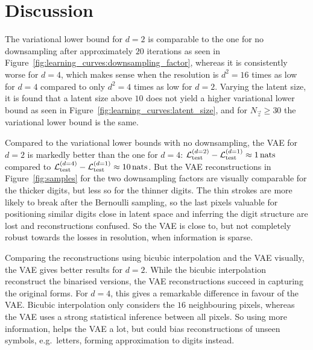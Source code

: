 \section{Discussion}
\label{sec:discussion}

The variational lower bound for $d = 2$ is comparable to the one for no downsampling after approximately $20$ iterations as seen in Figure~\ref{fig:learning_curves:downsampling_factor}, whereas it is consistently worse for $d = 4$, which makes sense when the resolution is $d^2 = 16$ times as low for $d = 4$ compared to only $d^2 = 4$ times as low for $d = 2$.
Varying the latent size, it is found that a latent size above $10$ does not yield a higher variational lower bound as seen in Figure~\ref{fig:learning_curves:latent_size}, and for $N_{\vec{z}} \geq 30$ the variational lower bound is the same.

Compared to the variational lower bounds with no downsampling, the VAE for $d = 2$ is markedly better than the one for $d = 4$: $\mathcal{L}_{\text{test}}^{(d = 2)} - \mathcal{L}_{\text{test}}^{(d = 1)} \approx \SI{1}{nats}$ compared to $\mathcal{L}_{\text{test}}^{(d = 4)} - \mathcal{L}_{\text{test}}^{(d = 1)} \approx \SI{10}{nats}$.
But the VAE reconstructions in Figure~\ref{fig:samples} for the two downsampling factors are visually comparable for the thicker digits, but less so for the thinner digits. The thin strokes are more likely to break after the Bernoulli sampling, so the last pixels valuable for positioning similar digits close in latent space and inferring the digit structure are lost and reconstructions confused.  
So the VAE is close to, but not completely robust towards the losses in resolution, when information is sparse. 

Comparing the reconstructions using bicubic interpolation and the VAE visually, the VAE gives better results for $d = 2$.
While the bicubic interpolation reconstruct the binarised versions, the VAE reconstructions succeed in capturing the original forms.
For $d = 4$, this gives a remarkable difference in favour of the VAE.
Bicubic interpolation only considers the $16$ neighbouring pixels, whereas the VAE uses a strong statistical inference between all pixels. So using more information, helps the VAE a lot, but could bias reconstructions of unseen symbols, e.g.\ letters, forming approximation to digits instead.
